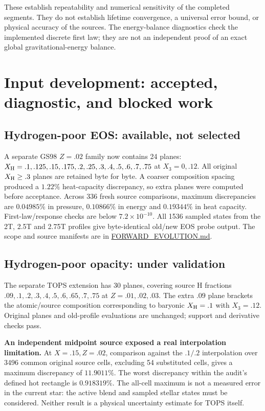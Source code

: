 \documentclass[11pt,letterpaper]{article}
\newcommand{\doc}[2]{\href{https://github.com/oklo/ember/blob/master/#1}{#2}}
\begin{document}
These establish repeatability and numerical sensitivity of the completed
segments. They do not establish lifetime convergence, a universal error bound,
or physical accuracy of the sources. The energy-balance diagnostics check the
implemented discrete first law; they are not an independent proof of an exact
global gravitational-energy balance.

\section{Input development: accepted, diagnostic, and blocked work}
\subsection{Hydrogen-poor EOS: available, not selected}
A separate GS98 $Z=.02$ family now contains 24 planes:
$X_{\rm H}=.1,.125,.15,.175,.2,.25,.3,.4,.5,.6,.7,.75$ at
$X_3=0,.12$. All original $X_{\rm H}\geq.3$ planes are retained byte for byte.
A coarser composition spacing produced a $1.22\%$ heat-capacity discrepancy,
so extra planes were computed before acceptance. Across 336 fresh source
comparisons, maximum discrepancies are $0.04985\%$ in pressure,
$0.10866\%$ in energy and $0.19344\%$ in heat capacity. First-law/response
checks are below $7.2\times10^{-10}$. All 1536 sampled states from the 2T,
2.5T and 2.75T profiles give byte-identical old/new EOS probe output.
The scope and source manifests are in
\doc{docs/FORWARD_EVOLUTION.md}{FORWARD\_EVOLUTION.md}.

\subsection{Hydrogen-poor opacity: under validation}
The separate TOPS extension has 30 planes, covering source H fractions
$.09,.1,.2,.3,.4,.5,.6,.65,.7,.75$ at $Z=.01,.02,.03$.
The extra $.09$ plane brackets the atomic/source composition corresponding to
baryonic $X_{\rm H}=.1$ with $X_3=.12$. Original planes and old-profile evaluations
are unchanged; support and derivative checks pass.

\textbf{An independent midpoint source exposed a real interpolation limitation.}
At $X=.15,Z=.02$, comparison against the $.1/.2$ interpolation over 3496
common original source cells, excluding 54 substituted cells, gives a maximum
discrepancy of $11.9011\%$. The worst discrepancy within the audit's defined hot
rectangle is $0.918319\%$. The all-cell maximum is not a measured error in the
current star: the active blend and sampled stellar states must be considered.
Neither result is a physical uncertainty estimate for TOPS itself.
\end{document}
